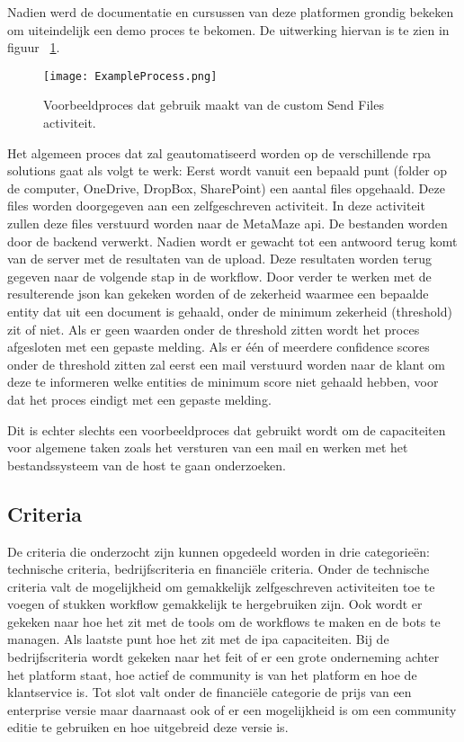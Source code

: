  Nadien werd de documentatie en cursussen van deze platformen grondig bekeken om uiteindelijk een demo proces te bekomen. De uitwerking hiervan is te zien in figuur ~\ref{fig:exampleProcess}.

\begin{figure}[h]
	\texttt{[image: ExampleProcess.png]}
	\caption[Te automatiseren demoproces]{Voorbeeldproces dat gebruik maakt van de custom Send Files \gls{activiteit}.}
	\label{fig:exampleProcess}
\end{figure}

Het algemeen proces dat zal geautomatiseerd worden op de verschillende \acrshort{rpa} solutions gaat als volgt te werk: Eerst wordt vanuit een bepaald punt (folder op de computer, OneDrive, DropBox, SharePoint) een aantal files opgehaald. Deze files worden doorgegeven aan een zelfgeschreven \gls{activiteit}. In deze \gls{activiteit} zullen deze files verstuurd worden naar de MetaMaze \acrshort{api}. De bestanden worden door de backend verwerkt. Nadien wordt er gewacht tot een antwoord terug komt van de server met de resultaten van de upload. Deze resultaten worden terug gegeven naar de volgende stap in de \gls{workflow}. Door verder te werken met de resulterende \acrshort{json} kan gekeken worden of de zekerheid waarmee een bepaalde entity dat uit een document is gehaald, onder de minimum zekerheid (threshold) zit of niet. Als er geen waarden onder de threshold zitten wordt het proces afgesloten met een gepaste melding. Als er één of meerdere confidence scores onder de threshold zitten zal eerst een mail verstuurd worden naar de klant om deze te informeren welke entities de minimum score niet gehaald hebben, voor dat het proces eindigt met een gepaste melding.

Dit is echter slechts een voorbeeldproces dat gebruikt wordt om de capaciteiten voor algemene taken zoals het versturen van een mail en werken met het bestandssysteem van de host te gaan onderzoeken.

\subsection{Criteria}
De criteria die onderzocht zijn kunnen opgedeeld worden in drie categorieën: technische criteria, bedrijfscriteria en financiële criteria. Onder de technische criteria valt de mogelijkheid om gemakkelijk zelfgeschreven \gls{activiteit}en toe te voegen of stukken \gls{workflow} gemakkelijk te hergebruiken zijn. Ook wordt er gekeken naar hoe het zit met de tools om de \gls{workflow}s te maken en de bots te managen. Als laatste punt hoe het zit met de \acrshort{ipa} capaciteiten. Bij de bedrijfscriteria wordt gekeken naar het feit of er een grote onderneming achter het platform staat, hoe actief de community is van het platform en hoe de klantservice is. Tot slot valt onder de financiële categorie de prijs van een enterprise versie maar daarnaast ook of er een mogelijkheid is om een community editie te gebruiken en hoe uitgebreid deze versie is.

